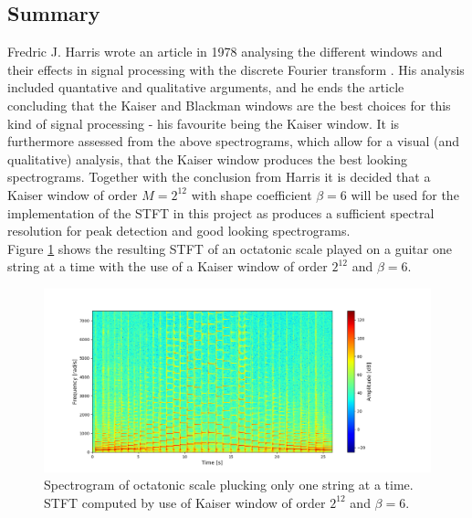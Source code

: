 \subsection{Summary}
Fredric J. Harris wrote an article in 1978 analysing the different windows and their effects in signal processing with the discrete Fourier transform \cite{page 82, fredric_harris}. His analysis included quantative and qualitative arguments, and he ends the article concluding that the Kaiser and Blackman windows are the best choices for this kind of signal processing - his favourite being the Kaiser window. It is furthermore assessed from the above spectrograms, which allow for a visual (and qualitative) analysis, that the Kaiser window produces the best looking spectrograms. Together with the conclusion from Harris it is decided that a Kaiser window of order $M=2^{12}$ with shape coefficient $\beta = 6$ will be used for the implementation of the STFT in this project as produces a sufficient spectral resolution for peak detection and good looking spectrograms.\\
Figure \ref{fig:STFT_test_signal} shows the resulting STFT of an octatonic scale played on a guitar one string at a time with the use of a Kaiser window of order $2^{12}$ and $\beta = 6$.

\begin{figure}[H]
\centering
\includegraphics[width = 1.1\textwidth]{figures/validation/stft/scale.png}
\caption{Spectrogram of octatonic scale plucking only one string at a time. STFT computed by use of Kaiser window of order $2^{12}$ and $\beta = 6$.}
\label{fig:STFT_test_signal}
\end{figure}